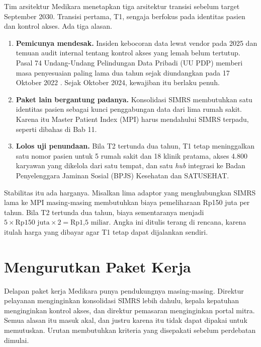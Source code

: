 \begin{kasus}[title={Kasus Medikara Health: Transisi Pertama untuk Identitas Pasien dan Kontrol Akses}]
  Tim arsitektur Medikara menetapkan tiga arsitektur transisi sebelum target
  September 2030. Transisi pertama, T1, sengaja berfokus pada identitas pasien
  dan kontrol akses. Ada tiga alasan.

  \begin{enumerate}
    \item \textbf{Pemicunya mendesak.} Insiden kebocoran data lewat vendor pada
          2025 dan temuan audit internal tentang kontrol akses yang lemah belum
          tertutup. Pasal 74 Undang-Undang Pelindungan Data Pribadi (UU PDP)
          memberi masa penyesuaian paling lama dua tahun sejak diundangkan
          pada 17 Oktober 2022 \cite{uu27-2022-pdp}. Sejak Oktober 2024,
          kewajiban itu berlaku penuh.
    \item \textbf{Paket lain bergantung padanya.} Konsolidasi SIMRS membutuhkan
          satu identitas pasien sebagai kunci penggabungan data dari lima rumah
          sakit. Karena itu Master Patient Index (MPI) harus mendahului SIMRS
          terpadu, seperti dibahas di Bab 11.
    \item \textbf{Lolos uji penundaan.} Bila T2 tertunda dua tahun, T1 tetap
          meninggalkan satu nomor pasien untuk 5 rumah sakit dan 18 klinik
          pratama, akses 4.800 karyawan yang dikelola dari satu tempat, dan
          satu \textit{hub} integrasi ke Badan Penyelenggara Jaminan Sosial
          (BPJS) Kesehatan dan SATUSEHAT.
  \end{enumerate}

  Stabilitas itu ada harganya. Misalkan lima adaptor yang menghubungkan SIMRS
  lama ke MPI masing-masing membutuhkan biaya pemeliharaan Rp150 juta per
  tahun. Bila T2 tertunda dua tahun, biaya sementaranya menjadi
  $5 \times \text{Rp150 juta} \times 2 = \text{Rp1,5 miliar}$. Angka ini ditulis
  terang di rencana, karena itulah harga yang dibayar agar T1 tetap dapat
  dijalankan sendiri.
\end{kasus}

\section{Mengurutkan Paket Kerja}

Delapan paket kerja Medikara punya pendukungnya masing-masing. Direktur pelayanan
menginginkan konsolidasi SIMRS lebih dahulu, kepala kepatuhan menginginkan
kontrol akses, dan direktur pemasaran menginginkan portal mitra. Semua alasan
itu masuk akal, dan justru karena itu tidak dapat dipakai untuk memutuskan.
Urutan membutuhkan kriteria yang disepakati sebelum perdebatan dimulai.

